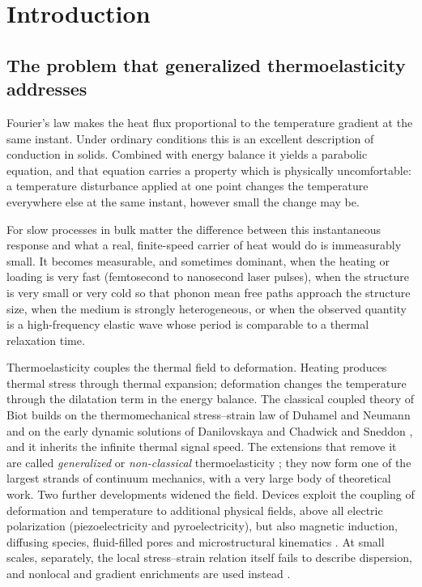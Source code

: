 \section{Introduction}\label{sec:intro}
\subsection{The problem that generalized thermoelasticity addresses}
Fourier's law makes the heat flux proportional to the temperature gradient at the same instant. Under ordinary conditions this is an excellent description of conduction in solids. Combined with energy balance it yields a parabolic equation, and that equation carries a property which is physically uncomfortable: a temperature disturbance applied at one point changes the temperature everywhere else at the same instant, however small the change may be.

For slow processes in bulk matter the difference between this instantaneous response and what a real, finite-speed carrier of heat would do is immeasurably small. It becomes measurable, and sometimes dominant, when the heating or loading is very fast (femtosecond to nanosecond laser pulses), when the structure is very small or very cold so that phonon mean free paths approach the structure size, when the medium is strongly heterogeneous, or when the observed quantity is a high-frequency elastic wave whose period is comparable to a thermal relaxation time.

Thermoelasticity couples the thermal field to deformation. Heating produces thermal stress through thermal expansion; deformation changes the temperature through the dilatation term in the energy balance. The classical coupled theory of Biot \citep{Biot1956} builds on the thermomechanical stress--strain law of Duhamel and Neumann \citep{Duhamel1837} and on the early dynamic solutions of Danilovskaya \citep{Danilovskaya1950} and Chadwick and Sneddon \citep{ChadwickSneddon1958,Chadwick1960}, and it inherits the infinite thermal signal speed. The extensions that remove it are called \emph{generalized} or \emph{non-classical} thermoelasticity \citep{Chandrasekharaiah1986,Chandrasekharaiah1998,HetnarskiIgnaczak1999,HetnarskiIgnaczak2000,IgnaczakOstoja2010}; they now form one of the largest strands of continuum mechanics, with a very large body of theoretical work. Two further developments widened the field. Devices exploit the coupling of deformation and temperature to additional physical fields, above all electric polarization (piezoelectricity and pyroelectricity), but also magnetic induction, diffusing species, fluid-filled pores and microstructural kinematics \citep{Mindlin1974Thermopiezo,Nowacki1978,Eringen1999,Iesan2004}. At small scales, separately, the local stress--strain relation itself fails to describe dispersion, and nonlocal and gradient enrichments are used instead \citep{Eringen1972,Eringen1983,Aifantis1992,Askes2011}.

